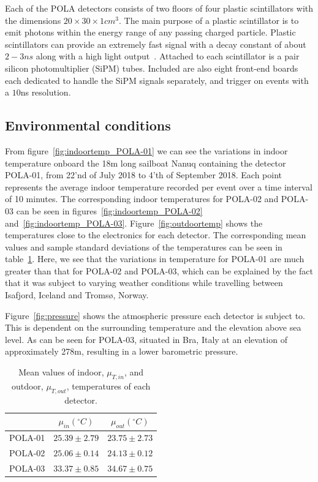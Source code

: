 \documentclass[12pt,a4paper]{amsart}
\begin{document}
Each of the POLA detectors consists of two floors of four plastic scintillators with the dimensions $20\times30\times1 \si{cm}^3$. The main purpose of a plastic scintillator is to emit photons within the energy range of any passing charged particle. Plastic scintillators can provide an extremely fast signal with a decay constant of about $2-3\si{ns}$ along with a high light output~\cite{leo1994}. Attached to each scintillator is a pair silicon photomultiplier (SiPM) tubes. Included are also eight front-end boards each dedicated to handle the SiPM signals separately, and trigger on events with a $10$ns resolution.

\setcounter{section}{3}
\setcounter{subsection}{0}
\subsection{Environmental conditions}
From figure~\ref{fig:indoortemp_POLA-01} we can see the variations in indoor temperature onboard the 18m long sailboat Nanuq containing the detector POLA-01, from 22'nd of July 2018 to 4'th of September 2018. Each point represents the average indoor temperature recorded per event over a time interval of 10 minutes. The corresponding indoor temperatures for POLA-02 and POLA-03 can be seen in figures~\ref{fig:indoortemp_POLA-02} and~\ref{fig:indoortemp_POLA-03}. Figure~\ref{fig:outdoortemp} shows the temperatures close to the electronics for each detector. The corresponding mean values and sample standard deviations of the temperatures can be seen in table~\ref{tab:temperatures}. Here, we see that the variations in temperature for POLA-01 are much greater than that for POLA-02 and POLA-03, which can be explained by the fact that it was subject to varying weather conditions while travelling between Isafjord, Iceland and Tromsø, Norway.

Figure~\ref{fig:pressure} shows the atmospheric pressure each detector is subject to. This is dependent on the surrounding temperature and the elevation above sea level. As can be seen for POLA-03, situated in Bra, Italy at an elevation of approximately 278m, resulting in a lower barometric pressure. 

\begin{table}[t]
\caption{Mean values of indoor, $\mu_{T, in}$, and outdoor, $\mu_{T, out}$, temperatures of each detector.}
\label{tab:temperatures}
\begin{tabular}{c|cc}
\hline
\hline
        & $\mu_{in} ({}^\circ \si{C})$ &$\mu_{out}({}^\circ \si{C})$ \\ \hline
POLA-01 & $25.39\pm 2.79$	& $23.75\pm 2.73$ \\
POLA-02 & $25.06\pm 0.14$    & $24.13\pm 0.12$ \\
POLA-03 & $33.37\pm 0.85$    & $34.67\pm 0.75$ \\
\hline \hline
\end{tabular}
\end{table}
\end{document}
